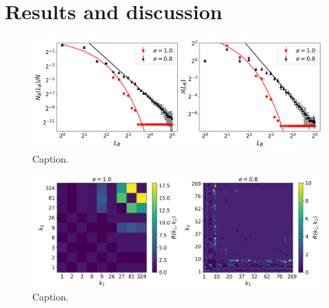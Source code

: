 \section{Results and discussion}


\begin{figure}[!h]
	\begin{center}
	\includegraphics[scale=0.47]{./images/task_6/N_B_and_S_vs_L_B.png} 
	\end{center}
	\caption{Caption.\\} 
	\label{fig:N_B_and_S_vs_L_B} 
\end{figure}

\begin{figure}[!h]
	\begin{center}
	\includegraphics[scale=0.47]{./images/task_6/R_k1_k2_comparison.png} 
	\end{center}
	\caption{Caption.\\} 
	\label{fig:R_k1_k2_comparison} 
\end{figure}



\lipsum[2-4]


\newpage